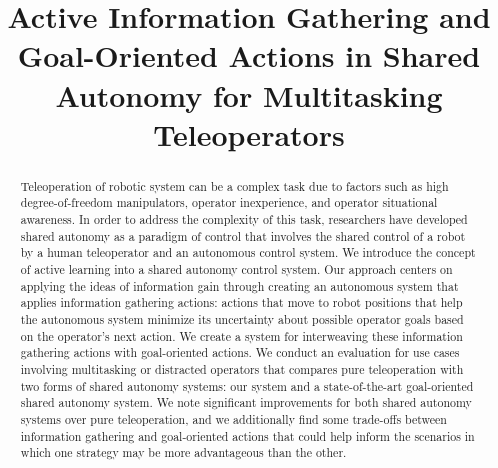 \documentclass[conference]{IEEEtran}
\begin{document}
\title{Active Information Gathering and Goal-Oriented Actions in Shared Autonomy for Multitasking Teleoperators\\
}

\author{
\and
{}
}

\maketitle

\begin{abstract}
Teleoperation of robotic system can be a complex task due to factors such as high degree-of-freedom manipulators, operator inexperience, and operator situational awareness. In order to address the complexity of this task, researchers have developed shared autonomy as a paradigm of control that involves the shared control of a robot by a human teleoperator and an autonomous control system. We introduce the concept of active learning into a shared autonomy control system. Our approach centers on applying the ideas of information gain through creating an autonomous system that applies information gathering actions: actions that move to robot positions that help the autonomous system minimize its uncertainty about possible operator goals based on the operator's next action. We create a system for interweaving these information gathering actions with goal-oriented actions. We conduct an evaluation for use cases involving multitasking or distracted operators that compares pure teleoperation with two forms of shared autonomy systems: our system and a state-of-the-art goal-oriented shared autonomy system. We note significant improvements for both shared autonomy systems over pure teleoperation, and we additionally find some trade-offs between information gathering and goal-oriented actions that could help inform the scenarios in which one strategy may be more advantageous than the other.
\end{abstract}
\end{document}
